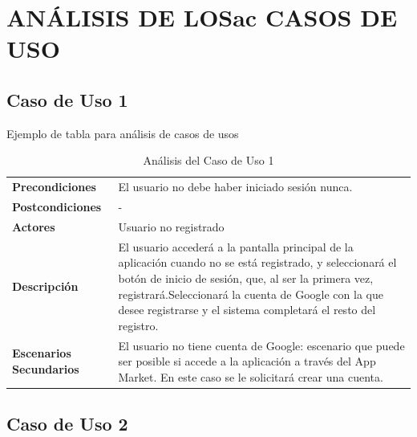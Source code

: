 \documentclass[11pt]{report}
\begin{document}
\newpage
\section{ANÁLISIS DE LOSac CASOS DE USO}

\subsection{Caso de Uso 1} 

\textcolor[rgb]{0.65,0.16,0}{Ejemplo de tabla para análisis de casos de usos}

\begin{table}[H]
  \centering
  \vspace{-5mm}
  \caption{Análisis del Caso de Uso 1}
    \begin{tabular}{p{7.5em}p{24.145em}}
    \toprule
    \rowcolor[rgb]{ .871,  .918,  .965} \multicolumn{2}{p{31.645em}}{\textbf{Registro}} \\
    \midrule
    \rowcolor[rgb]{ .906,  .902,  .902} \textbf{Precondiciones} & \cellcolor[rgb]{ 1,  1,  1}El usuario no debe haber iniciado sesión nunca. \\
    \midrule
    \rowcolor[rgb]{ .906,  .902,  .902} \textbf{Postcondiciones} & \cellcolor[rgb]{ 1,  1,  1}- \\
    \midrule
    \rowcolor[rgb]{ .906,  .902,  .902} \textbf{Actores} & \cellcolor[rgb]{ 1,  1,  1}Usuario no registrado \\
    \midrule
    \rowcolor[rgb]{ .906,  .902,  .902} \textbf{Descripción} & \cellcolor[rgb]{ 1,  1,  1}El usuario accederá a la pantalla principal de la aplicación cuando no se está registrado, y seleccionará el botón de inicio de sesión, que, al ser la primera vez, registrará.Seleccionará la cuenta de Google con la que desee registrarse y el sistema completará el resto del registro. \\
    \midrule
    \rowcolor[rgb]{ .906,  .902,  .902} \textbf{Escenarios          Secundarios} & \cellcolor[rgb]{ 1,  1,  1} El usuario no tiene cuenta de Google: escenario que puede ser posible si accede a la aplicación a través del App Market. En este caso se le solicitará crear una cuenta. \\
    \bottomrule
    \end{tabular}%
\end{table}%
 
\subsection{Caso de Uso 2}
\end{document}

